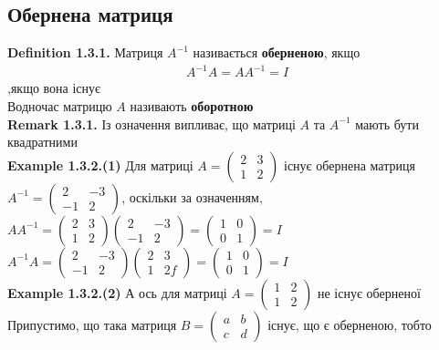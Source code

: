 \documentclass[a4paper, 10pt]{article}
\def\defin#1{\textbf{Definition {#1}}}
\def\ex#1{\textbf{Example {#1}}}
\def\rm#1{\textbf{Remark {#1}}}
\theoremstyle{theoremdd}
\theoremstyle{theoremdd}
\theoremstyle{theoremdd}
\theoremstyle{theoremdd}
\theoremstyle{theoremdd}
\theoremstyle{theoremdd}
\theoremstyle{theoremdd}
\theoremstyle{theoremdd}
\begin{document}
	\subsection{Обернена матриця}
	\defin{1.3.1.} Матриця $A^{-1}$ називається \textbf{оберненою}, якщо
	\begin{align*}
	A^{-1} A = A A^{-1} = I
	\end{align*}
	,якщо вона існує\\
	Водночас матрицю $A$ називають \textbf{оборотною}
	\bigskip \\
	\rm{1.3.1.} Із означення випливає, що матриці $A$ та $A^{-1}$ мають бути квадратними 
	\bigskip \\
	\ex{1.3.2.(1)} Для матриці $A = \begin{pmatrix}
	2 & 3 \\
	1 & 2
	\end{pmatrix}$ існує обернена матриця $A^{-1} = \begin{pmatrix}
	2 & -3 \\
	-1 & 2
	\end{pmatrix}$, оскільки за означенням,\\
	$AA^{-1} = \begin{pmatrix}
	2 & 3 \\
	1 & 2
	\end{pmatrix} \begin{pmatrix}
	2 & -3 \\
	-1 & 2
	\end{pmatrix} = \begin{pmatrix}
	1 & 0 \\
	0 & 1
	\end{pmatrix} = I$\\
	$A^{-1}A = \begin{pmatrix}
	2 & -3 \\
	-1 & 2
	\end{pmatrix} \begin{pmatrix}
	2 & 3 \\
	1 & 2f
	\end{pmatrix} = \begin{pmatrix}
	1 & 0 \\
	0 & 1
	\end{pmatrix} = I$
	\bigskip \\
	\ex{1.3.2.(2)} А ось для матриці $A = \begin{pmatrix}
	1 & 2 \\
	1 & 2
	\end{pmatrix}$ не існує оберненої\\
	Припустимо, що така матриця $B = \begin{pmatrix}
	a & b \\
	c & d
	\end{pmatrix}$ існує, що є оберненою, тобто\\
\end{document}
